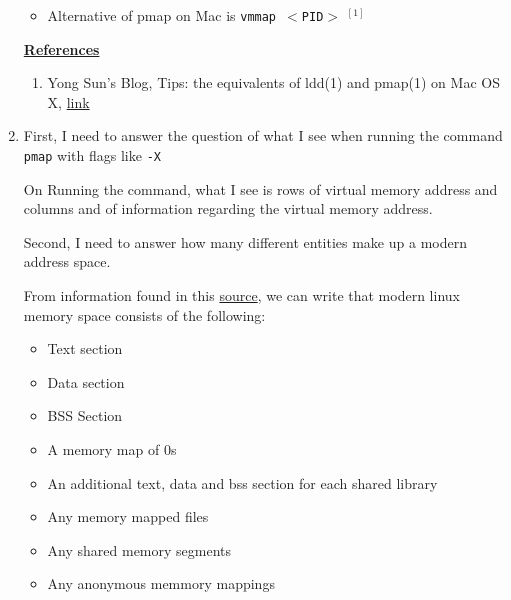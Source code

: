 \documentclass[12pt]{article}
\begin{document}
\begin{enumerate}[1.]
    \begin{itemize}
        \item Alternative of pmap on Mac is \texttt{vmmap $<$PID$>$} $^{[1]}$
    \end{itemize}

    \bigskip

    \underline{\textbf{References}}

    \begin{enumerate}[1)]
        \item Yong Sun's Blog, Tips: the equivalents of ldd(1) and pmap(1) on Mac OS X, \href{http://yongsun.me/2009/01/tips-the-equivalents-of-ldd1-and-pmap1-on-mac-os-x/}{link}
    \end{enumerate}

    \item

    First, I need to answer the question of what I see when running the command
    \texttt{pmap} with flags like \texttt{-X}

    \bigskip

    On Running the command, what I see is rows of virtual memory address and columns and of
    information regarding the virtual memory address.

    \bigskip

    Second, I need to answer how many different entities make up a modern address space.

    \bigskip

    From information found in this \href{http://books.gigatux.nl/mirror/kerneldevelopment/0672327201/ch14.html}{source},
    we can write that modern linux memory space consists of the following:

    \begin{itemize}
        \item Text section
        \item Data section
        \item BSS Section
        \item A memory map of 0s
        \item An additional text, data and bss section for each shared library
        \item Any memory mapped files
        \item Any shared memory segments
        \item Any anonymous memmory mappings
    \end{itemize}

\end{enumerate}
\end{document}

